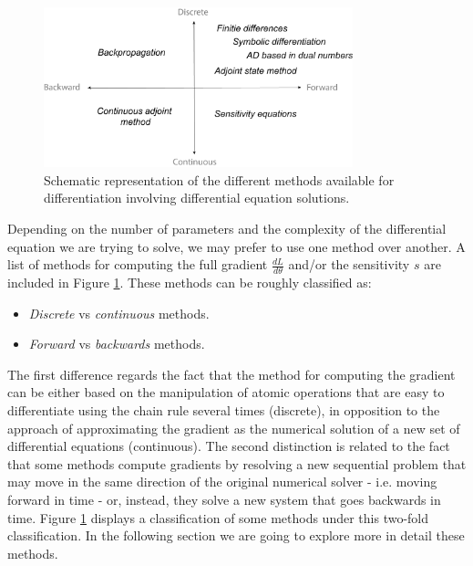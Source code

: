 \begin{figure}[]
    \centering
    \includegraphics[width=0.80\textwidth]{figures/scheme-methods.png}
    \caption{Schematic representation of the different methods available for differentiation involving differential equation solutions.}
    \label{fig:diff}
\end{figure}
Depending on the number of parameters and the complexity of the differential equation we are trying to solve, we may prefer to use one method over another. A list of methods for computing the full gradient $\frac{dL}{d\theta}$ and/or the sensitivity $s$ are included in Figure \ref{fig:diff}.
These methods can be roughly classified as:
\begin{itemize}
    \item \textit{Discrete} vs \textit{continuous} methods.
    \item \textit{Forward} vs \textit{backwards} methods.
\end{itemize}
The first difference regards the fact that the method for computing the gradient can be either based on the manipulation of atomic operations that are easy to differentiate using the chain rule several times (discrete), in opposition to the approach of approximating the gradient as the numerical solution of a new set of differential equations (continuous). The second distinction is related to the fact that some methods compute gradients by resolving a new sequential problem that may move in the same direction of the original numerical solver - i.e. moving forward in time - or, instead, they solve a new system that goes backwards in time. Figure \ref{fig:diff} displays a classification of some methods under this two-fold classification. In the following section we are going to explore more in detail these methods.